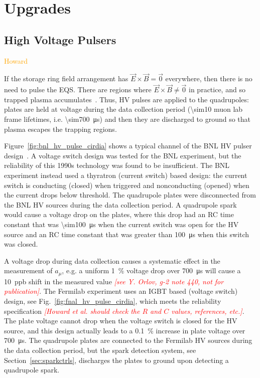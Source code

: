 \section{\label{sec:upgrades} Upgrades}

\subsection{\label{sec:pulsers} High Voltage Pulsers}
\textcolor{orange}{Howard}
\medskip

If the storage ring field arrangement has $\vec{E}\times\vec{B}=\vec{0}$ everywhere, then there is no need to pulse the EQS. There are regions where $\vec{E}\times\vec{B}\neq\vec{0}$ in practice, and so trapped plasma accumulates~\cite{Semertzidis:2003zs}. Thus, HV pulses are applied to the quadrupoles: plates are held at voltage during the data collection period (\SI{\sim10}{} muon lab frame lifetimes, i.e. \SI{\sim700}{\micro\second}) and then they are discharged to ground so that plasma escapes the trapping regions.

Figure~\ref{fig:bnl_hv_pulse_cirdia} shows a typical channel of the BNL HV pulser design~\cite{Semertzidis:2003zs}. A voltage switch design was tested for the BNL experiment, but the reliability of this 1990s technology was found to be insufficient. The BNL experiment instead used a thyratron (current switch) based design: the current switch is conducting (closed) when triggered and nonconducting (opened) when the current drops below threshold. The quadrupole plates were disconnected from the BNL HV sources during the data collection period. A quadrupole spark would cause a voltage drop on the plates, where this drop had an RC time constant that was \SI{\sim100}{\micro\second} when the current switch was open for the HV source and an RC time constant that was greater than \SI{100}{\micro\second} when this switch was closed.

A voltage drop during data collection causes a systematic effect in the measurement of $a_{\mu}$, e.g. a uniform \SI{1}{\percent} voltage drop over \SI{700}{\micro\second} will cause a \SI{10}{ppb} shift in the measured value \textcolor{red}{\textit{[see Y. Orlov, g-2 note 440, not for publication]}}. The Fermilab experiment uses an IGBT based (voltage switch) design, see Fig.~\ref{fig:fnal_hv_pulse_cirdia}, which meets the reliability specification \textcolor{red}{\textit{[Howard et al. should check the $R$ and $C$ values, references, etc.]}}. The plate voltage cannot drop when the voltage switch is closed for the HV source, and this design actually leads to a \SI{0.1}{\percent} increase in plate voltage over \SI{700}{\micro\second}. The quadrupole plates are connected to the Fermilab HV sources during the data collection period, but the spark detection system, see Section~\ref{sec:sparkctrls}, discharges the plates to ground upon detecting a quadrupole spark.

